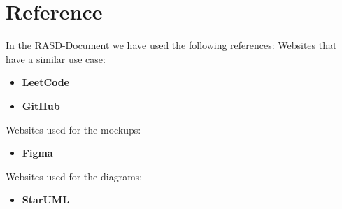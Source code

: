 \chapter{Reference}
In the RASD-Document we have used the following references:
\newline
Websites that have a similar use case:
\begin{itemize}
    \item \textbf{LeetCode}
    \item \textbf{GitHub}
\end{itemize}

Websites used for the mockups:
\begin{itemize}
    \item \textbf{Figma}
\end{itemize}

Websites used for the diagrams:
\begin{itemize}
    \item \textbf{StarUML}
\end{itemize}
